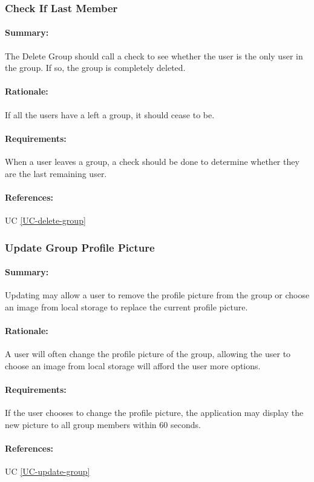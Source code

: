 \documentclass[11pt]{article}
\begin{document}
\subsubsection{Check If Last Member} \label{FR-Check-Last-User}
\paragraph{Summary:} The Delete Group should call a check to see whether the user is the only user in the group. If so, the group is completely deleted.
\paragraph{Rationale:} If all the users have a left a group, it should cease to be.
\paragraph{Requirements:} When a user leaves a group, a check should be done to determine whether they are the last remaining user.
\paragraph{References:} UC \ref{UC-delete-group}

\subsubsection{Update Group Profile Picture} \label{FR-update-group-picture}
\paragraph{Summary:}
Updating may allow a user to remove the profile picture from the group or choose an image from local storage to replace the current profile picture.
\paragraph{Rationale:}
A user will often change the profile picture of the group, allowing the user to choose an image from local storage will afford the user more options.
\paragraph{Requirements:}
If the user chooses to change the profile picture, the application may display the new picture to all group members within 60 seconds.
\paragraph{References:} UC \ref{UC-update-group}
\end{document}
